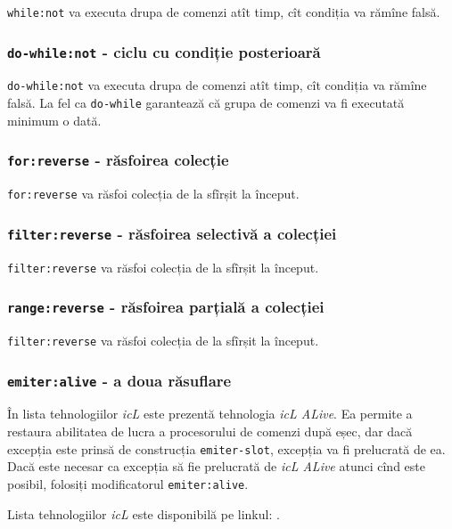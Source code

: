 \texttt{while:not} va executa drupa de comenzi atît timp, cît condiția va rămîne falsă.

\subsubsection{\texttt{do-while:not} - ciclu cu condiție posterioară}

\texttt{do-while:not} va executa drupa de comenzi atît timp, cît condiția va rămîne falsă. La fel ca \texttt{do-while} garantează că grupa de comenzi va fi executată minimum o dată.

\subsubsection{\texttt{for:reverse} - răsfoirea colecție}

\texttt{for:reverse} va răsfoi colecția de la sfîrșit la început.

\subsubsection{\texttt{filter:reverse} - răsfoirea selectivă a colecției}

\texttt{filter:reverse} va răsfoi colecția de la sfîrșit la început.

\subsubsection{\texttt{range:reverse} - răsfoirea parțială a colecției}

\texttt{filter:reverse} va răsfoi colecția de la sfîrșit la început.

\subsubsection{\texttt{emiter:alive} - a doua răsuflare}

În lista tehnologiilor \textit{icL} este prezentă tehnologia \textit{icL ALive}. Ea permite a restaura abilitatea de lucra a procesorului de comenzi după eșec, dar dacă excepția este prinsă de construcția \texttt{emiter-slot}, excepția va fi prelucrată de ea. Dacă este necesar ca excepția să fie prelucrată de \textit{icL ALive} atunci cînd este posibil, folosiți modificatorul \texttt{emiter:alive}.

Lista tehnologiilor \textit{icL} este disponibilă pe linkul: .
